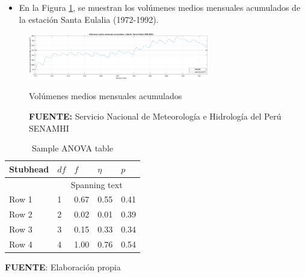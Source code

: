 \begin{itemize}
    \item En la Figura \ref{fig:21}, se muestran los volúmenes medios mensuales acumulados de la estación Santa Eulalia (1972-1992).
\end{itemize}

\begin{figure}[H]
    \centering
    \includegraphics[width=0.7\textwidth]{Figures/Volumenes.pdf}
    \caption{Volúmenes medios mensuales acumulados}
    \captionsetup{labelfont=rm,skip=2pt,textfont=rm,font=small}
        \caption*{\textbf{FUENTE:} Servicio Nacional de Meteorología e Hidrología del Perú SENAMHI}
    \label{fig:21}
\end{figure}

\begin{table}[H]
\centering
  \begin{threeparttable}
    \caption{Sample ANOVA table}
     \begin{tabular}{lllll}
        \toprule \toprule
        Stubhead & \( df \) & \( f \) & \( \eta \) & \( p \) \\
        \midrule
                 &     \multicolumn{4}{c}{Spanning text}     \\
        Row 1    & 1        & 0.67    & 0.55       & 0.41    \\
        Row 2    & 2        & 0.02    & 0.01       & 0.39    \\
        Row 3    & 3        & 0.15    & 0.33       & 0.34    \\
        Row 4    & 4        & 1.00    & 0.76       & 0.54    \\
        \bottomrule
     \end{tabular}
    \begin{tablenotes}
    \vspace{-0.5cm}
        \item {{\fontsize{10pt}{ \baselineskip}\selectfont \textbf{FUENTE}: Elaboración propia}}
    \end{tablenotes}
\end{threeparttable}
\end{table}




